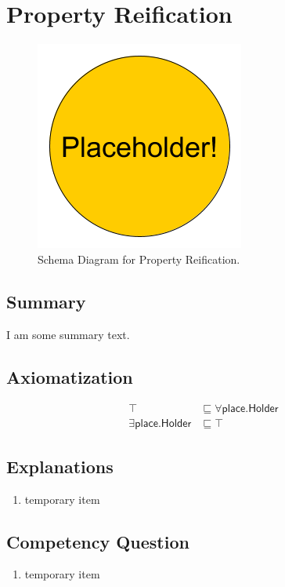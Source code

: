 \section{Property Reification}
\label{sec:Property}
\begin{figure}[h!]
\begin{center}
\includegraphics[width=.4\textwidth]{figures/placeholder}
\end{center}
\caption{Schema Diagram for Property Reification.}
\label{fig:Property}
\end{figure}
\subsection{Summary}
\label{sum:Property}
I am some summary text.

\subsection{Axiomatization}
\label{axs:Property}
\begin{align}
\top &\sqsubseteq \forall\textsf{place.Holder} \\ 
\exists\textsf{place.Holder} &\sqsubseteq \top 
\end{align}

\subsection{Explanations}
\label{exp:Property}
\begin{enumerate}
\item temporary item
\end{enumerate}

\subsection{Competency Question}
\label{cqs:Property}
\begin{enumerate}[CQ1.]
\item temporary item
\end{enumerate}

\newpage
